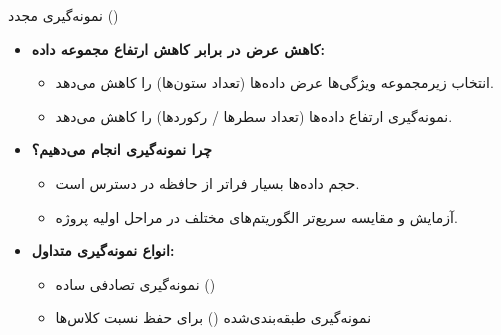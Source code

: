 
\begin{frame}{نمونه‌گیری مجدد ()}
\begin{itemize}
  \item \textbf{کاهش عرض در برابر کاهش ارتفاع مجموعه داده:}
  \begin{itemize}
    \item انتخاب زیرمجموعه ویژگی‌ها عرض داده‌ها (تعداد ستون‌ها) را کاهش می‌دهد.
    \item نمونه‌گیری ارتفاع داده‌ها (تعداد سطرها / رکوردها) را کاهش می‌دهد.
  \end{itemize}
  \vspace{0.3cm}
  \item \textbf{چرا نمونه‌گیری انجام می‌دهیم؟}
  \begin{itemize}
    \item حجم داده‌ها بسیار فراتر از حافظه در دسترس است.
    \item آزمایش و مقایسه سریع‌تر الگوریتم‌های مختلف در مراحل اولیه پروژه.
  \end{itemize}
  \vspace{0.3cm}
  \item \textbf{انواع نمونه‌گیری متداول:}
  \begin{itemize}
    \item نمونه‌گیری تصادفی ساده ()
    \item نمونه‌گیری طبقه‌بندی‌شده () برای حفظ نسبت کلاس‌ها
  \end{itemize}
\end{itemize}
\end{frame}

